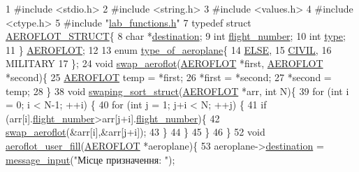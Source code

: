 \begin{DoxyCodeInclude}
1 \textcolor{preprocessor}{#include <stdio.h>}
2 \textcolor{preprocessor}{#include <string.h>}
3 \textcolor{preprocessor}{#include <values.h>}
4 \textcolor{preprocessor}{#include <ctype.h>}
5 \textcolor{preprocessor}{#include "\hyperlink{lab__functions_8h}{lab\_functions.h}"}
7 \textcolor{keyword}{typedef} \textcolor{keyword}{struct }\hyperlink{structAEROFLOT__STRUCT}{AEROFLOT\_STRUCT}\{
8     \textcolor{keywordtype}{char} *\hyperlink{structAEROFLOT__STRUCT_a4a959b0e5f73bb401dccc9c248cf801c}{destination};
9     \textcolor{keywordtype}{int} \hyperlink{structAEROFLOT__STRUCT_a7f89c90169893ea6426d49cbfe252b6b}{flight\_number};
10     \textcolor{keywordtype}{int} \hyperlink{structAEROFLOT__STRUCT_a913aeac90752fd046f3ca7410093bb36}{type};
11 \} \hyperlink{structAEROFLOT__STRUCT}{AEROFLOT};
12 
13 \textcolor{keyword}{enum} \hyperlink{main_8c_a85e61e12a1348f292d1732e066b2a900}{type\_of\_aeroplane}\{
14         \hyperlink{main_8c_a85e61e12a1348f292d1732e066b2a900a90d649d830ea440c8b8a56c7ef23c426}{ELSE},
15         \hyperlink{main_8c_a85e61e12a1348f292d1732e066b2a900a3e60759ca7436e59d1ae9b759fc69877}{CIVIL},
16         MILITARY
17 \};
24 \textcolor{keywordtype}{void} \hyperlink{main_8c_a86c3d2cb6728b6e961242f105a4c2579}{swap\_aeroflot}(\hyperlink{structAEROFLOT__STRUCT}{AEROFLOT} *first, \hyperlink{structAEROFLOT__STRUCT}{AEROFLOT} *second)\{
25     \hyperlink{structAEROFLOT__STRUCT}{AEROFLOT} temp = *first;
26     *first = *second;
27     *second = temp;
28 \}
38 \textcolor{keywordtype}{void} \hyperlink{main_8c_ada53f29a40add605d28459936c17d8df}{swaping\_sort\_struct}(\hyperlink{structAEROFLOT__STRUCT}{AEROFLOT} *arr, \textcolor{keywordtype}{int} N)\{
39     \textcolor{keywordflow}{for} (\textcolor{keywordtype}{int} i = 0; i < N-1; ++i) \{
40         \textcolor{keywordflow}{for} (\textcolor{keywordtype}{int} j = 1; j+i < N; ++j) \{
41             \textcolor{keywordflow}{if} (arr[i].\hyperlink{structAEROFLOT__STRUCT_a7f89c90169893ea6426d49cbfe252b6b}{flight\_number}>arr[j+i].\hyperlink{structAEROFLOT__STRUCT_a7f89c90169893ea6426d49cbfe252b6b}{flight\_number})\{
42                 \hyperlink{main_8c_a86c3d2cb6728b6e961242f105a4c2579}{swap\_aeroflot}(&arr[i],&arr[j+i]);
43             \}
44         \}
45     \}
46 \}
52 \textcolor{keywordtype}{void} \hyperlink{main_8c_a0e67aa1728da412b6d456dcd67400c28}{aeroflot\_user\_fill}(\hyperlink{structAEROFLOT__STRUCT}{AEROFLOT} *aeroplane)\{
53     aeroplane->\hyperlink{structAEROFLOT__STRUCT_a4a959b0e5f73bb401dccc9c248cf801c}{destination} = \hyperlink{lab__functions_8h_a53c0a255092a68903d4627229c37d7d0}{message\_input}(\textcolor{stringliteral}{"Місце призначення: "});

\end{DoxyCodeInclude}
